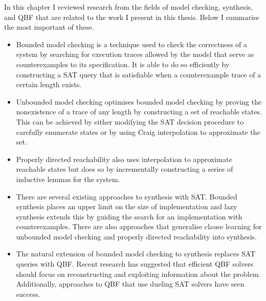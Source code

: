 In this chapter I reviewed research from the fields of model checking, synthesis, and QBF that are related to the work I present in this thesis. Below I summarise the most important of these.

\begin{itemize}
    \item Bounded model checking is a technique used to check the correctness of a system by searching for execution traces allowed by the model that serve as counterexamples to its specification. It is able to do so efficiently by constructing a SAT query that is satisfiable when a counterexample trace of a certain length exists.
    \item Unbounded model checking optimises bounded model checking by proving the nonexistence of a trace of any length by constructing a set of reachable states. This can be achieved by either modifying the SAT decision procedure to carefully enumerate states or by using Craig interpolation to approximate the set.
    \item Properly directed reachability also uses interpolation to approximate reachable states but does so by incrementally constructing a series of inductive lemmas for the system.
    \item There are several existing approaches to synthesis with SAT. Bounded synthesis places an upper limit on the size of implementation and lazy synthesis extends this by guiding the search for an implementation with counterexamples. There are also approaches that generalise clause learning for unbounded model checking and properly directed reachability into synthesis.
    \item The natural extension of bounded model checking to synthesis replaces SAT queries with QBF. Recent research has suggested that efficient QBF solvers should focus on reconstructing and exploiting information about the problem. Additionally, approaches to QBF that use dueling SAT solvers have seen success.
\end{itemize}
